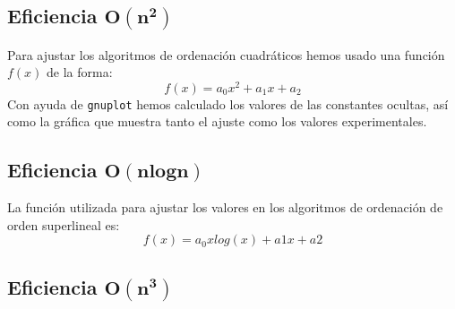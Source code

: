 \documentclass[11pt]{article}
\begin{document}
\subsection*{Eficiencia $\boldsymbol{O(n^2)}$}

Para ajustar los algoritmos de ordenación cuadráticos hemos usado una función $f(x)$ de la forma: $$f(x) = a_0x^2 + a_1x + a_2$$ Con ayuda de \verb|gnuplot| hemos calculado los valores de las constantes ocultas, así como la gráfica que muestra tanto el ajuste como los valores experimentales.

\begin{center}
	
\end{center}

\begin{center}
	
\end{center}

\begin{center}
	
\end{center}
\newpage
\subsection*{Eficiencia $\boldsymbol{O(n log n)}$}

La función utilizada para ajustar los valores en los algoritmos de ordenación de orden superlineal es: $$f(x) = a_0xlog(x) + a1x + a2$$


\begin{adjustbox}{center}
	\fontsize{6.7pt}{7.2}\selectfont
	\resizebox*{12cm}{!}{
				
			}
\end{adjustbox}



\begin{adjustbox}{center}
	\fontsize{6.8pt}{7.2}\selectfont
	\resizebox*{12cm}{!}{
				
			}
\end{adjustbox}

\begin{adjustbox}{center}
	\fontsize{6.8pt}{7.2}\selectfont
	\resizebox*{12cm}{!}{
				
			}
\end{adjustbox}

\subsection*{Eficiencia $\boldsymbol{O(n^3)}$}
\end{document}
